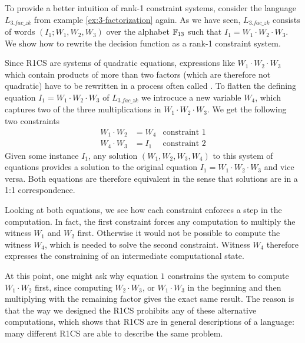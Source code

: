 \begin{example}[3-Factorization]\label{ex:3-factorization-r1cs} To provide a better intuition of rank-1 constraint systems, consider the language $L_{3.fac\_zk}$ from example \ref{ex:3-factorization} again. As we have seen, $L_{3.fac\_zk}$ consists of words $(I_1;W_1,W_2,W_3)$ over the alphabet $\mathbb{F}_{13}$ such that $I_1 = W_1\cdot W_2\cdot W_3$. We show how to rewrite the decision function as a rank-1 constraint system.

Since R1CS are systems of quadratic equations, expressions like $W_1\cdot W_2\cdot W_3$ which contain products of more than two factors (which are therefore not quadratic) have to be rewritten in a process often called . To flatten the defining equation $I_1 = W_1\cdot W_2\cdot W_3$ of $L_{3.fac\_zk}$ we introcuce a new variable $W_4$, which captures two of the three multiplications in $W_1\cdot W_2\cdot W_3$. We get the following two constraints
\begin{align*}
W_1 \cdot W_2 & = W_4 & \text{constraint } 1\\
W_4 \cdot W_3 & = I_1 & \text{constraint } 2
\end{align*}
Given some instance $I_1$, any solution $(W_1,W_2,W_3,W_4)$ to this system of equations provides a solution to the original equation $I_1 = W_1\cdot W_2\cdot W_3$ and vice versa. Both equations are therefore equivalent in the sense that solutions are in a 1:1 correspondence.

Looking at both equations, we see how each constraint enforces a step in the computation. In fact, the first constraint forces any computation to multiply the witness $W_1$ and $W_2$ first. Otherwise it would not be possible to compute the witness $W_4$, which is needed to solve the second constraint. Witness $W_4$ therefore expresses the constraining of an intermediate computational state.

At this point, one might ask why equation $1$ constrains the system to compute $W_1\cdot W_2$ first, since computing $W_2\cdot W_3$, or $W_1\cdot W_3$ in the beginning and then multiplying with the remaining factor gives the exact same result.  The reason is that  the way we designed the R1CS prohibits any of these alternative computations, which shows that R1CS are in general  descriptions of a language: many different R1CS are able to describe the same problem.


\end{example}
